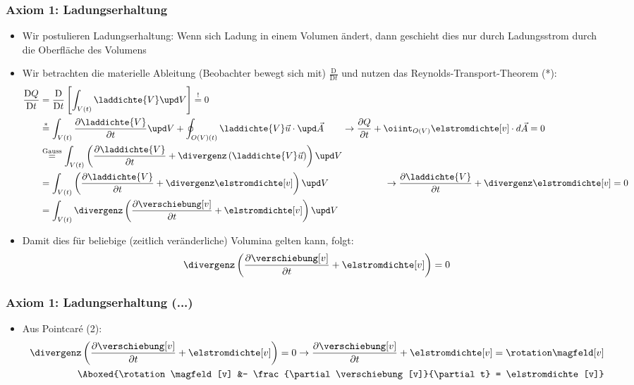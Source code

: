 \begin{frame}
  \frametitle{Axiom 1: Ladungserhaltung}
\begin{itemize}[<+->]
\item Wir postulieren Ladungserhaltung: Wenn sich Ladung in einem Volumen ändert, dann geschieht dies nur durch Ladungsstrom durch die Oberfläche des Volumens 
\item Wir betrachten die materielle Ableitung (Beobachter bewegt sich mit) $\frac{\mathrm{D}}{\mathrm{D} t}$ und nutzen das Reynolds-Transport-Theorem (*):
  \begin{align*}
\frac{\mathrm{D} Q}{\mathrm{D} t} & = \frac{\mathrm{D}}{\mathrm{D} t}\left[ \int_{V(t)} \laddichte{V} \upd V \right] \stackrel{!}{=} 0\\
 &\stackrel{*}{=} \int_{V(t)} \frac{\partial \laddichte{V}}{\partial t} \upd V + \oint_{O(V)(t)}\laddichte{V} \vec{u}\cdot \upd\vec{A} \qquad \to \frac{\partial Q}{\partial t} + \oiint_{O(V)} \elstromdichte[v]\cdot d\vec{A} = 0\\
& \stackrel{\text{Gauss}}{=} \int_{V(t)} \left(\frac{\partial \laddichte{V}}{\partial t} + \divergenz \left(\laddichte{V} \vec{u} \right) \right) \upd V  \\
&= \int_{V(t)} \left(\frac{\partial \laddichte{V}}{\partial t} + \divergenz \elstromdichte[v] \right) \upd V  \qquad\qquad\qquad \to \frac{\partial \laddichte{V}}{\partial t} + \divergenz \elstromdichte[v] = 0 \\
&= \int_{V(t)} \divergenz \left( \frac{\partial \verschiebung[v]}{\partial t} + \elstromdichte[v]\right) \upd V
  \end{align*}
  \item Damit dies für beliebige (zeitlich veränderliche) Volumina gelten kann, folgt:
    \begin{equation*}
      \divergenz \left( \frac{\partial \verschiebung[v]}{\partial t} + \elstromdichte[v]\right) = 0
      \end{equation*}
    
    \end{itemize}

\end{frame}

\begin{frame}
  \frametitle{Axiom 1: Ladungserhaltung (...)}
\begin{itemize}[<+->]
\item Aus Pointcaré (2):
  \begin{align*}
    \divergenz \left( \frac{\partial \verschiebung[v]}{\partial t} + \elstromdichte[v]\right) = 0 \to \frac{\partial \verschiebung[v]}{\partial t} + \elstromdichte[v] = \rotation\magfeld[v] &\\
    \Aboxed{\rotation\magfeld[v] &- \frac{\partial \verschiebung[v]}{\partial t} = \elstromdichte[v]} 
    \end{align*}
\end{itemize}
\end{frame}

